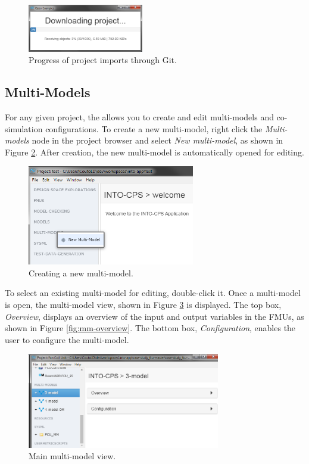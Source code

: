 \begin{figure}[ht]
\centering
\includegraphics[width=0.45\textwidth]{./figures/app/git-prog}
\caption{Progress of project imports through Git.}
\label{fig:git-prog}
\end{figure}
%
%
%
\subsection{Multi-Models}
\label{sub:multi-models}
For any given project, the \intoapp{} allows you to create and edit multi-models and
co-simulation configurations. To create a new multi-model, right click the
\textit{Multi-models} node in the project browser and select  \textit{New
multi-model}, as shown in Figure \ref{fig:new-mm}. After creation, the new
multi-model is automatically opened for editing.
%
%
%
\begin{figure}[h!]
\centering
\includegraphics[width=0.65\textwidth]{./figures/app/new-mm}
\caption{Creating a new multi-model.}
\label{fig:new-mm}
\end{figure}
%
%
%
To select an existing multi-model for editing, double-click it. 
Once a multi-model is open, the multi-model view, shown in
Figure \ref{fig:mm-view} is displayed. The top box, \textit{Overview},
displays an overview of the input and output variables in the FMUs,
as shown in Figure \ref{fig:mm-overview}. The bottom box, \textit{Configuration}, enables the user to configure the multi-model.
%
%
%
\begin{figure}[h!]
\centering
\includegraphics[width=0.75\textwidth]{./figures/app/mm-view}
\caption{Main multi-model view.}
\label{fig:mm-view}
\end{figure}
